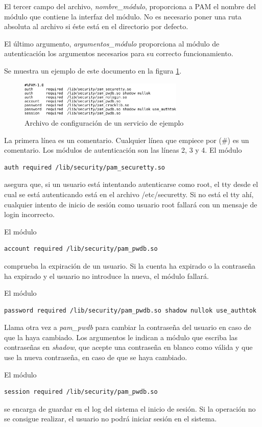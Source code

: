 \documentclass[titlepage, 12pt, a4paper]{article}
\begin{document}
El tercer campo del archivo, \textit{nombre\_módulo}, proporciona a PAM el nombre del módulo que contiene la interfaz del módulo. No es necesario poner una ruta absoluta al archivo si éste está en el directorio por defecto. \par
El último argumento, \textit{argumentos\_módulo} proporciona al módulo de autenticación los argumentos necesarios para su correcto funcionamiento. \par
Se muestra un ejemplo de este documento en la figura \ref{fig:archivoServicio}.
\begin{figure}[H]
    \centering
    \includegraphics[width=0.7\textwidth]{Media/PAMConfigFile.png}
    \caption{Archivo de configuración de un servicio de ejemplo}
    \label{fig:archivoServicio}
\end{figure}
La primera línea es un comentario. Cualquier línea que empiece por (\#) es un comentario. Los módulos de autenticación son las líneas 2, 3 y 4. El módulo
\begin{lstlisting}
auth required /lib/security/pam_securetty.so
\end{lstlisting}
asegura que, si un usuario está intentando autenticarse como root, el \gls{tty} desde el cual se está autenticando está en el archivo /etc/securetty. Si no está el \gls{tty} ahí, cualquier intento de inicio de sesión como usuario \gls{root} fallará con un mensaje de login incorrecto. \par
El módulo 
\begin{lstlisting}
account required /lib/security/pam_pwdb.so
\end{lstlisting}
comprueba la expiración de un usuario. Si la cuenta ha expirado o la contraseña ha expirado y el usuario no introduce la nueva, el módulo fallará. \par
El módulo 
\begin{lstlisting}
password required /lib/security/pam_pwdb.so shadow nullok use_authtok
\end{lstlisting}
Llama otra vez a \textit{pam\_pwdb} para cambiar la contraseña del usuario en caso de que la haya cambiado. Los argumentos le indican a módulo que escriba las contraseñas en \textit{shadow}, que acepte una contraseña en blanco como válida y que use la nueva contraseña, en caso de que se haya cambiado. \par
El módulo
\begin{lstlisting}
session required /lib/security/pam_pwdb.so
\end{lstlisting}
se encarga de guardar en el log del sistema el inicio de sesión. Si la operación no se consigue realizar, el usuario no podrá iniciar sesión en el sistema.
\end{document}
